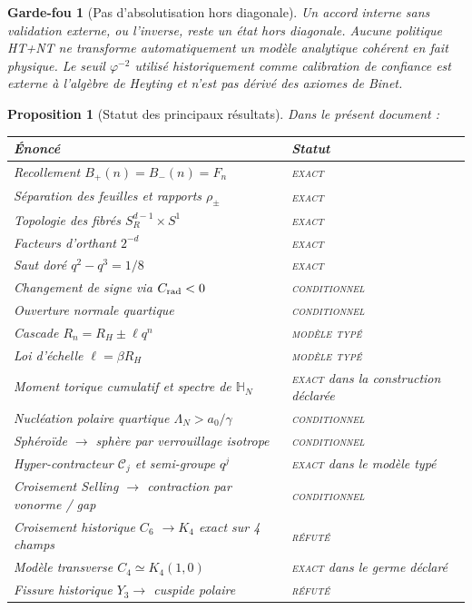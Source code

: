 \documentclass[11pt,a4paper]{article}
\newtheorem{proposition}[theorem]{Proposition}
\newtheorem{guardrail}[theorem]{Garde-fou}
\newcommand{\ph}{\varphi}
\newcommand{\statusExact}{\textsc{exact}}
\newcommand{\statusCond}{\textsc{conditionnel}}
\newcommand{\statusTyped}{\textsc{modèle typé}}
\begin{document}
\begin{guardrail}[Pas d'absolutisation hors diagonale]
Un accord interne sans validation externe, ou l'inverse, reste un état hors diagonale. Aucune politique HT+NT ne transforme automatiquement un modèle analytique cohérent en fait physique. Le seuil $\ph^{-2}$ utilisé historiquement comme calibration de confiance est externe à l'algèbre de Heyting et n'est pas dérivé des axiomes de Binet.
\end{guardrail}

\begin{proposition}[Statut des principaux résultats]
Dans le présent document :
\begin{center}
\begin{tabularx}{\textwidth}{@{}>{\raggedright\arraybackslash}X l@{}}
\toprule
Énoncé & Statut\\
\midrule
Recollement $B_+(n)=B_-(n)=F_n$ & \statusExact\\
Séparation des feuilles et rapports $\rho_\pm$ & \statusExact\\
Topologie des fibrés $S_R^{d-1}\times S^1$ & \statusExact\\
Facteurs d'orthant $2^{-d}$ & \statusExact\\
Saut doré $q^2-q^3=1/8$ & \statusExact\\
Changement de signe via $C_{\rm rad}<0$ & \statusCond\\
Ouverture normale quartique & \statusCond\\
Cascade $R_n=R_H\pm\ell q^n$ & \statusTyped\\
Loi d'échelle $\ell=\beta R_H$ & \statusTyped\\
Moment torique cumulatif et spectre de $\mathbb H_N$ & \statusExact{} dans la construction déclarée\\
Nucléation polaire quartique $\Lambda_N>a_0/\gamma$ & \statusCond\\
Sphéroïde $\to$ sphère par verrouillage isotrope & \statusCond\\
Hyper-contracteur $\mathcal C_j$ et semi-groupe $q^j$ & \statusExact{} dans le modèle typé\\
Croisement Selling $\to$ contraction par vonorme / gap & \statusCond\\
Croisement historique $C_6$ $\to K_4$ exact sur 4 champs & \textsc{réfuté}\\
Modèle transverse $C_4\simeq K_4(1,0)$ & \statusExact{} dans le germe déclaré\\
Fissure historique $Y_3\to$ cuspide polaire & \textsc{réfuté}\\

\end{tabularx}
\end{center}
\end{proposition}
\end{document}
